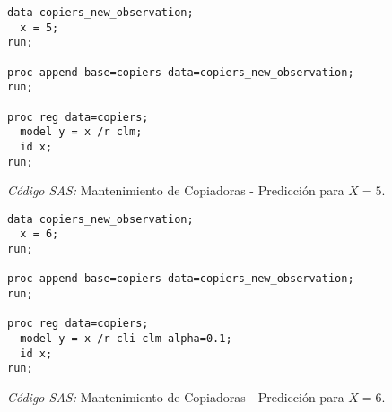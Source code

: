 \documentclass{article}
\begin{document}
    \begin{figure}[!h]
      \centering
      \begin{verbatim}
data copiers_new_observation;
  x = 5;
run;

proc append base=copiers data=copiers_new_observation;
run;

proc reg data=copiers;
  model y = x /r clm;
  id x;
run;
      \end{verbatim}
      \caption{\emph{Código SAS:} Mantenimiento de Copiadoras - Predicción para $X = 5$.}
      \label{code:sas-copiers-3}
    \end{figure}

    \begin{figure}[!h]
      \centering
      \begin{verbatim}
data copiers_new_observation;
  x = 6;
run;

proc append base=copiers data=copiers_new_observation;
run;

proc reg data=copiers;
  model y = x /r cli clm alpha=0.1;
  id x;
run;
      \end{verbatim}
      \caption{\emph{Código SAS:} Mantenimiento de Copiadoras - Predicción para $X = 6$.}
      \label{code:sas-copiers-4}
    \end{figure}


  \nocite{rano2017}
  \nocite{sas}
  \nocite{neter1996applied}
  \nocite{montgomery2012introduction}

  
  
\end{document}
